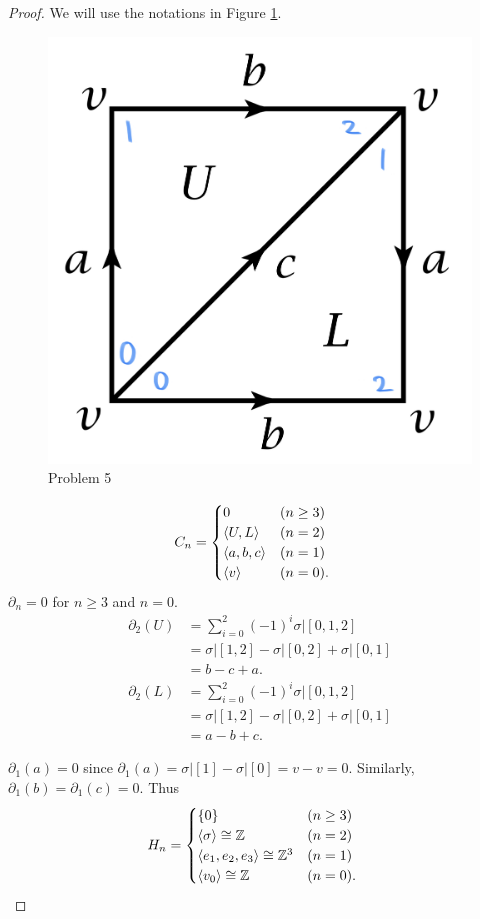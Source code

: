 \documentclass[12pt, psamsfonts]{amsart}
\theoremstyle{definition}
\theoremstyle{remark}
\numberwithin{equation}{section}
\begin{document}
\begin{proof}
  We will use the notations in Figure \ref{fig:problem5_klein}.
  \begin{figure}
    \includegraphics[width=.3\linewidth]{problem5_klein.jpeg}
    \caption{Problem 5}
    \label{fig:problem5_klein}
  \end{figure}

  \begin{align*}
    C_n &= \begin{cases}
      0 & (n \geq 3) \\
      \ev{ U, L } & (n = 2) \\
      \ev{ a, b, c} & (n = 1) \\
      \ev{ v } & (n = 0).
    \end{cases}
  \end{align*}
  $\partial_n = 0$ for $n \geq 3$ and $n = 0$.
  \begin{align*}
    \partial_2(U)
      &= \sum_{i = 0}^2 (-1)^i \sigma \vert [0, 1, 2] \\
      &= \sigma \vert [1, 2] - \sigma \vert [0, 2] + \sigma \vert [0, 1] \\
      &= b - c + a. \\
    \partial_2(L)
      &= \sum_{i = 0}^2 (-1)^i \sigma \vert [0, 1, 2] \\
      &= \sigma \vert [1, 2] - \sigma \vert [0, 2] + \sigma \vert [0, 1] \\
      &= a - b + c.
  \end{align*}

  $\partial_1(a) = 0$ since $\partial_1(a) = \sigma \vert [1] - \sigma \vert [0] = v - v = 0$.
  Similarly, $\partial_1(b) = \partial_1(c) = 0$.
  Thus
  \begin{align*}
    H_n &= \begin{cases}
      \{ 0 \} & (n \geq 3) \\
      \ev{ \sigma } \cong \mathbb{Z} & (n = 2) \\
      \ev{ e_1, e_2, e_3 } \cong \mathbb{Z}^3 & (n = 1) \\
      \ev{ v_0 } \cong \mathbb{Z} & (n = 0).
    \end{cases}
  \end{align*}
\end{proof}
\end{document}
